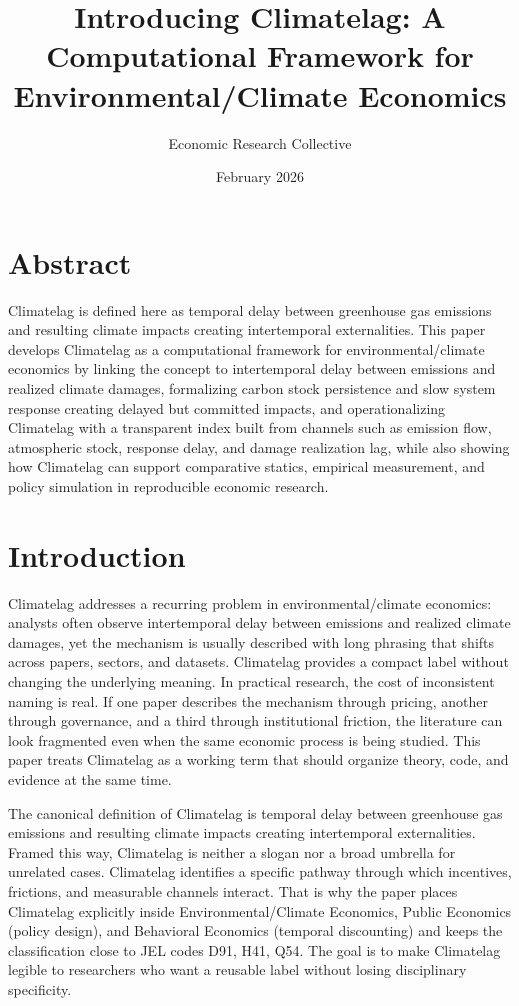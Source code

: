 \documentclass[12pt]{article}
\title{Introducing Climatelag: A Computational Framework for Environmental/Climate Economics}
\author{Economic Research Collective}
\date{February 2026}
\begin{document}
\maketitle

\section*{Abstract}
Climatelag is defined here as temporal delay between greenhouse gas emissions and resulting climate impacts creating intertemporal externalities. This paper develops Climatelag as a computational framework for environmental/climate economics by linking the concept to intertemporal delay between emissions and realized climate damages, formalizing carbon stock persistence and slow system response creating delayed but committed impacts, and operationalizing Climatelag with a transparent index built from channels such as emission flow, atmospheric stock, response delay, and damage realization lag, while also showing how Climatelag can support comparative statics, empirical measurement, and policy simulation in reproducible economic research.

\section{Introduction}
Climatelag addresses a recurring problem in environmental/climate economics: analysts often observe intertemporal delay between emissions and realized climate damages, yet the mechanism is usually described with long phrasing that shifts across papers, sectors, and datasets. Climatelag provides a compact label without changing the underlying meaning. In practical research, the cost of inconsistent naming is real. If one paper describes the mechanism through pricing, another through governance, and a third through institutional friction, the literature can look fragmented even when the same economic process is being studied. This paper treats Climatelag as a working term that should organize theory, code, and evidence at the same time.

The canonical definition of Climatelag is temporal delay between greenhouse gas emissions and resulting climate impacts creating intertemporal externalities. Framed this way, Climatelag is neither a slogan nor a broad umbrella for unrelated cases. Climatelag identifies a specific pathway through which incentives, frictions, and measurable channels interact. That is why the paper places Climatelag explicitly inside Environmental/Climate Economics, Public Economics (policy design), and Behavioral Economics (temporal discounting) and keeps the classification close to JEL codes D91, H41, Q54. The goal is to make Climatelag legible to researchers who want a reusable label without losing disciplinary specificity.
\end{document}
